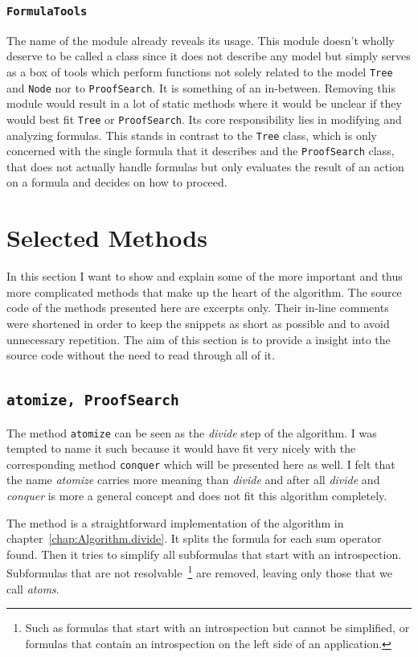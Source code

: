 \subsubsection[FormulaTools]{\texttt{FormulaTools}}
The name of the module already reveals its usage. This module doesn't wholly deserve to be called a class since it does not describe any model but simply serves as a box of tools which perform functions not solely related to the model \texttt{Tree} and \texttt{Node} nor to \texttt{ProofSearch}. It is something of an in-between. Removing this module would result in a lot of static methods where it would be unclear if they would best fit \texttt{Tree} or \texttt{ProofSearch}. Its core responsibility lies in modifying and analyzing formulas. This stands in contrast to the \texttt{Tree} class, which is only concerned with the single formula that it describes and the \texttt{ProofSearch} class, that does not actually handle formulas but only evaluates the result of an action on a formula and decides on how to proceed.


\section{Selected Methods}
In this section I want to show and explain some of the more important and thus more complicated methods that make up the heart of the algorithm. The source code of the methods presented here are excerpts only. Their in-line comments were shortened in order to keep the snippets as short as possible and to avoid unnecessary repetition. The aim of this section is to provide a insight into the source code without the need to read through all of it. 

\subsection[atomize]{\texttt{atomize, ProofSearch}}
The method \texttt{atomize} can be seen as the \emph{divide} step of the algorithm. I was tempted to name it such because it would have fit very nicely with the corresponding method \texttt{conquer} which will be presented here as well. I felt that the name \emph{atomize} carries more meaning than \emph{divide} and after all \emph{divide} and \emph{conquer} is more a general concept and does not fit this algorithm completely.

The method is a straightforward implementation of the algorithm in chapter~\ref{chap:Algorithm.divide}. It splits the formula for each sum operator found. Then it tries to simplify all subformulas that start with an introspection. Subformulas that are not resolvable~\footnote{Such as formulas that start with an introspection but cannot be simplified, or formulas that contain an introspection on the left side of an application.} are removed, leaving only those that we call \emph{atoms}.

